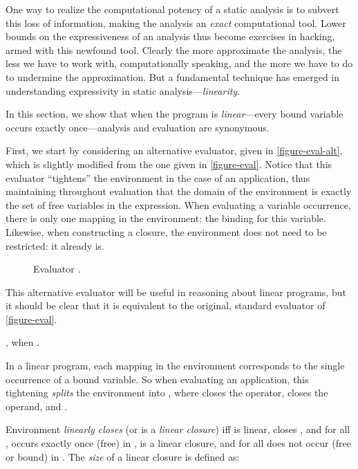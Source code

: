 One way to realize the computational potency of a static analysis is
to subvert this loss of information, making the analysis an {\em
exact} computational tool.  Lower bounds on the expressiveness of an
analysis thus become exercises in hacking, armed with this newfound
tool.  Clearly the more approximate the analysis, the less we have to
work with, computationally speaking, and the more we have to do to
undermine the approximation.  But a fundamental technique has emerged
in understanding expressivity in static analysis---{\em linearity}.


In this section, we show that when the program is {\em linear}---every
bound variable occurs exactly once---analysis and evaluation are
synonymous.

First, we start by considering an alternative evaluator, given in
\autoref{figure-eval-alt}, which is slightly modified from the one
given in \autoref{figure-eval}.  Notice that this evaluator
``tightens'' the environment in the case of an application, thus
maintaining throughout evaluation that the domain of the environment
is exactly the set of free variables in the expression.  When
evaluating a variable occurrence, there is only one mapping in the
environment: the binding for this variable. Likewise, when
constructing a closure, the environment does not need to be
restricted: it already is.


\begin{figure}

\caption{Evaluator .}
\label{figure-eval-alt}
\end{figure}



This alternative evaluator  will be useful in reasoning
about linear programs, but it should be clear that it is equivalent to
the original, standard evaluator  of \autoref{figure-eval}.

\begin{lemma}
, when .
\end{lemma}

In a linear program, each mapping in the environment corresponds to
the single occurrence of a bound variable.  So when evaluating an
application, this tightening {\em splits} the environment  into
, where  closes the operator,  closes
the operand, and .

\begin{definition}
Environment  {\em linearly closes}  (or  is a {\em linear closure}) iff  is linear, 
closes , and for all ,  occurs exactly once
(free) in ,  is a linear closure, and for all
 does not occur (free or bound) in . The
{\em size} of a linear closure  is defined as:

\end{definition}


